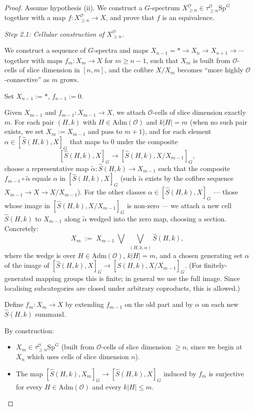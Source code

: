 \documentclass[12pt]{article}
\theoremstyle{definition}
\newcommand{\SpG}{\mathrm{Sp}^{G}}
\newcommand{\OO}{\mathcal{O}}
\newcommand{\admis}{\mathrm{Adm}}
\begin{document}
\begin{proof}
Assume hypothesis (ii). We construct a $G$-spectrum
$X^{\OO}_{\geq n}\in\tau_{\geq n}^{\OO}\SpG$ together with a map
$f\colon X^{\OO}_{\geq n}\to X$, and prove that $f$ is an equivalence.

\smallskip
\noindent\emph{Step 2.1: Cellular construction of $X^{\OO}_{\geq n}$.}

We construct a sequence of $G$-spectra and maps
$X_{n-1}=\ast\to X_{n}\to X_{n+1}\to\cdots$ together with maps
$f_{m}\colon X_{m}\to X$ for $m\geq n-1$, such that $X_{m}$ is built from
$\OO$-cells of slice dimension in $[n,m]$, and the cofibre $X/X_{m}$ becomes
``more highly $\OO$-connective'' as $m$ grows.

Set $X_{n-1}:=\ast$, $f_{n-1}:=0$.

Given $X_{m-1}$ and $f_{m-1}\colon X_{m-1}\to X$, we attach $\OO$-cells of
slice dimension exactly $m$. For each pair $(H,k)$ with $H\in\admis(\OO)$ and
$k|H|=m$ (when no such pair exists, we set $X_{m}:=X_{m-1}$ and pass to
$m+1$), and for each element $\alpha\in[\widehat{S}(H,k),X]_{G}$ that maps to
$0$ under the composite
\[
[\widehat{S}(H,k),X]_{G}\to[\widehat{S}(H,k),X/X_{m-1}]_{G},
\]
choose a representative map $\widetilde{\alpha}\colon\widehat{S}(H,k)\to
X_{m-1}$ such that the composite $f_{m-1}\circ\widetilde{\alpha}$ equals
$\alpha$ in $[\widehat{S}(H,k),X]_{G}$ (such $\widetilde{\alpha}$ exists by
the cofibre sequence $X_{m-1}\to X\to X/X_{m-1}$). For the other classes
$\alpha\in[\widehat{S}(H,k),X]_{G}$ — those whose image in
$[\widehat{S}(H,k),X/X_{m-1}]_{G}$ is non-zero — we attach a new cell
$\widehat{S}(H,k)$ to $X_{m-1}$ along $\widetilde{\alpha}$ wedged into the
zero map, choosing a section. Concretely:
\[
X_{m}\;:=\;X_{m-1}\;\bigvee\;\bigvee_{(H,k,\alpha)}\widehat{S}(H,k),
\]
where the wedge is over $H\in\admis(\OO)$, $k|H|=m$, and a chosen generating
set $\alpha$ of the image of $[\widehat{S}(H,k),X]_{G}\to
[\widehat{S}(H,k),X/X_{m-1}]_{G}$. (For finitely-generated mapping groups
this is finite; in general we use the full image. Since localising
subcategories are closed under arbitrary coproducts, this is allowed.)

Define $f_{m}\colon X_{m}\to X$ by extending $f_{m-1}$ on the old part and by
$\alpha$ on each new $\widehat{S}(H,k)$ summand.

By construction:
\begin{itemize}
\item $X_{m}\in\tau_{\geq n}^{\OO}\SpG$ (built from $\OO$-cells of slice
dimension $\geq n$, since we begin at $X_{n}$ which uses cells of slice
dimension $n$).
\item The map $[\widehat{S}(H,k),X_{m}]_{G}\to[\widehat{S}(H,k),X]_{G}$
induced by $f_{m}$ is surjective for every $H\in\admis(\OO)$ and every
$k|H|\leq m$.
\end{itemize}


\end{proof}
\end{document}
